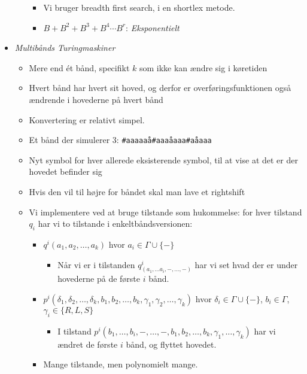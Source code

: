\begin{itemize}
\begin{itemize}
\begin{itemize}
			            \item Vi bruger breadth first search, i en shortlex metode.
			            \item $B + B^2 + B^{3} + B^{4} \cdots B^{r}$: \textit{Eksponentielt}
		            \end{itemize}
	      \end{itemize}
	\item \textit{Multibånds Turingmaskiner}
	      \begin{itemize}
		      \item Mere end ét bånd, specifikt $k$ som ikke kan ændre sig i køretiden
		      \item Hvert bånd har hvert sit hoved, og derfor er overføringsfunktionen også ændrende i hovederne på hvert bånd
		      \item Konvertering er relativt simpel.
		      \item Et bånd der simulerer 3: \texttt{\#aaaaaå\#aaaåaaa\#aåaaa}
		      \item Nyt symbol for hver allerede eksisterende symbol, til at vise at det er der hovedet befinder sig
		      \item Hvis den vil til højre for båndet skal man lave et rightshift
		      \item Vi implementere ved at bruge tilstande som hukommelse: for hver tilstand $q_{i}$ har vi to tilstande i enkeltbåndsversionen:
		            \begin{itemize}
			            \item $q^{i}(a_{1}, a_{2}, \ldots, a_{k})$ hvor $a_{i} \in \Gamma \cup \{-\}$
			                  \begin{itemize}
				                  \item Når vi er i tilstanden $q^{i}_{(a_{1}, \ldots a_{i}, -, \ldots, -)}$ har vi set hvad der er under hovederne på de første $i$ bånd.
			                  \end{itemize}
			            \item $p^{i}(\delta_{1}, \delta_{2}, \ldots, \delta_{k}, b_{1}, b_{2}, \ldots, b_{k}, \gamma_{1}, \gamma_{2}, \ldots, \gamma_{k})$ hvor $\delta_{i} \in \Gamma \cup \{-\}$, $b_{i} \in \Gamma$, $\gamma_{i} \in \{R,L,S\}$
			                  \begin{itemize}
				                  \item I tilstand $p^{i}(b_{1}, \ldots, b_{i}, -, \ldots, -, b_{1}, b_{2}, \ldots, b_{k}, \gamma_{1}, \ldots, \gamma_{k})$ har vi ændret de første $i$ bånd, og flyttet hovedet.
			                  \end{itemize}
			            \item Mange tilstande, men polynomielt mange.
		            \end{itemize}
	      \end{itemize}
\end{itemize}

